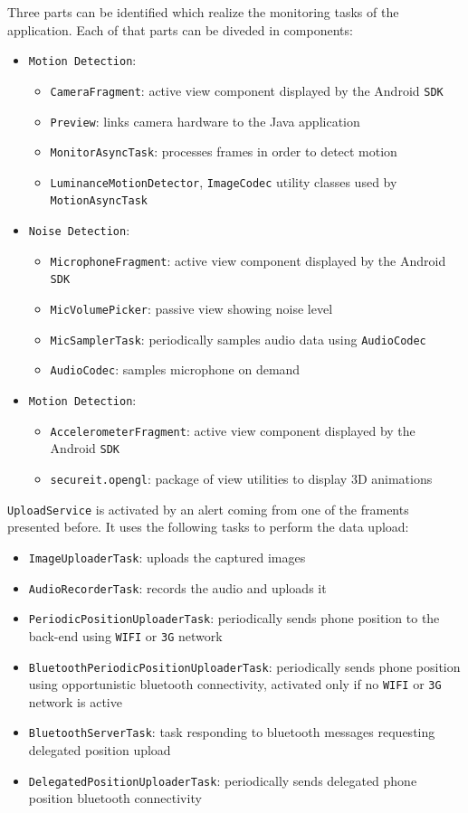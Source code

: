\documentclass[conference, 11pt]{IEEEtran}
\begin{document}
Three parts can be identified which realize the monitoring tasks of the application. Each of that parts can be diveded in components:
\begin{itemize}
	\item \texttt{Motion Detection}:
		\begin{itemize}
			\item \texttt{CameraFragment}: active view component displayed by the Android \texttt{SDK}
			\item \texttt{Preview}: links camera hardware to the Java application
			\item \texttt{MonitorAsyncTask}: processes frames in order to detect motion
			\item \texttt{LuminanceMotionDetector}, \texttt{ImageCodec} utility classes used by \texttt{MotionAsyncTask}
		\end{itemize}
	\item \texttt{Noise Detection}:
		\begin{itemize}
			\item \texttt{MicrophoneFragment}: active view component displayed by the Android \texttt{SDK}
			\item \texttt{MicVolumePicker}: passive view showing noise level
			\item \texttt{MicSamplerTask}: periodically samples audio data using \texttt{AudioCodec}
			\item \texttt{AudioCodec}: samples microphone on demand
		\end{itemize}
	\item \texttt{Motion Detection}:
		\begin{itemize}
			\item \texttt{AccelerometerFragment}: active view component displayed by the Android \texttt{SDK}
			\item \texttt{secureit.opengl}: package of view utilities to display 3D animations
		\end{itemize}
\end{itemize}

\texttt{UploadService} is activated by an alert coming from one of the framents presented before. It uses the following tasks to perform the data upload:
\begin{itemize}
	\item \texttt{ImageUploaderTask}: uploads the captured images
	\item \texttt{AudioRecorderTask}: records the audio and uploads it
	\item \texttt{PeriodicPositionUploaderTask}: periodically sends phone position to the back-end using \texttt{WIFI} or \texttt{3G} network
	\item \texttt{Bluetooth\allowbreak Periodic\allowbreak Position\allowbreak Uploader\allowbreak Task}: periodically sends phone position using opportunistic bluetooth connectivity, activated only if no \texttt{WIFI} or \texttt{3G} network is active
	\item \texttt{BluetoothServerTask}: task responding to bluetooth messages requesting delegated position upload
	\item \texttt{DelegatedPositionUploaderTask}: periodically sends delegated phone position bluetooth connectivity
\end{itemize}
\end{document}
